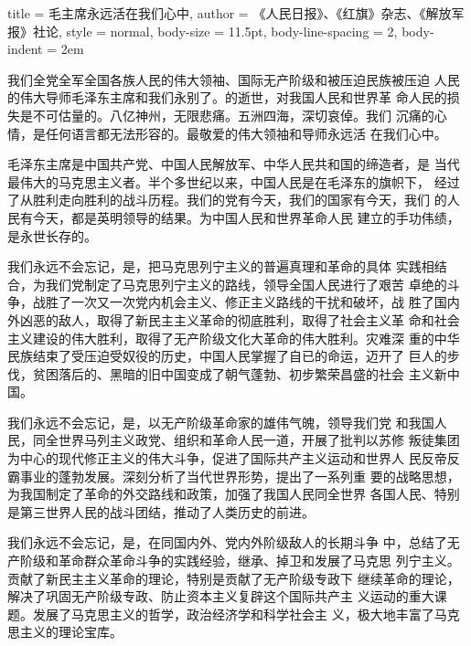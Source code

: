 \begin{hongqiarticle}{
        title  = {毛主席永远活在我们心中},
        author = {《人民日报》、《红旗》杂志、《解放军报》社论},
        style  = normal,
        body-size = 11.5pt,
        body-line-spacing = 2,
        body-indent = 2em
    }
    
    我们全党全军全国各族人民的伟大领袖、国际无产阶级和被压迫民族被压迫
    人民的伟大导师毛泽东主席和我们永别了。的逝世，对我国人民和世界革
    命人民的损失是不可估量的。八亿神州，无限悲痛。五洲四海，深切哀倬。我们
    沉痛的心情，是任何语言都无法形容的。最敬爱的伟大领袖和导师永远活
    在我们心中。
    
    毛泽东主席是中国共产党、中国人民解放军、中华人民共和国的缔造者，是
    当代最伟大的马克思主义者。半个多世纪以来，中国人民是在毛泽东的旗帜下，
    经过了从胜利走向胜利的战斗历程。我们的党有今天，我们的国家有今天，我们
    的人民有今天，都是英明领导的结果。为中国人民和世界革命人民
    建立的手功伟绩，是永世长存的。
    
    我们永远不会忘记，是，把马克思列宁主义的普遍真理和革命的具体
    实践相结合，为我们党制定了马克思列宁主义的路线，领导全国人民进行了艰苦
    卓绝的斗争，战胜了一次又一次党内机会主义、修正主义路线的干扰和破坏，战
    胜了国内外凶恶的敌人，取得了新民主主义革命的彻底胜利，取得了社会主义革
    命和社会主义建设的伟大胜利，取得了无产阶级文化大革命的伟大胜利。灾难深
    重的中华民族结束了受压迫受奴役的历史，中国人民掌握了自已的命运，迈开了
    巨人的步伐，贫困落后的、黑暗的旧中国变成了朝气蓬勃、初步繁荣昌盛的社会
    主义新中国。
    
    我们永远不会忘记，是，以无产阶级革命家的雄伟气魄，领导我们党
    和我国人民，同全世界马列主义政党、组织和革命人民一道，开展了批判以苏修
    叛徒集团为中心的现代修正主义的伟大斗争，促进了国际共产主义运动和世界人
    民反帝反霸事业的蓬勃发展。深刻分析了当代世界形势，提出了一系列重
    要的战略思想，为我国制定了革命的外交路线和政策，加强了我国人民同全世界
    各国人民、特别是第三世界人民的战斗团结，推动了人类历史的前进。
    
    我们永远不会忘记，是，在同国内外、党内外阶级敌人的长期斗争
    中，总结了无产阶级和革命群众革命斗争的实践经验，继承、掉卫和发展了马克思
    列宁主义。贡献了新民主主义革命的理论，特别是贡献了无产阶级专政下
    继续革命的理论，解决了巩固无产阶级专政、防止资本主义复辟这个国际共产主
    义运动的重大课题。发展了马克思主义的哲学，政治经济学和科学社会主
    义，极大地丰富了马克思主义的理论宝库。
    

\end{hongqiarticle}
